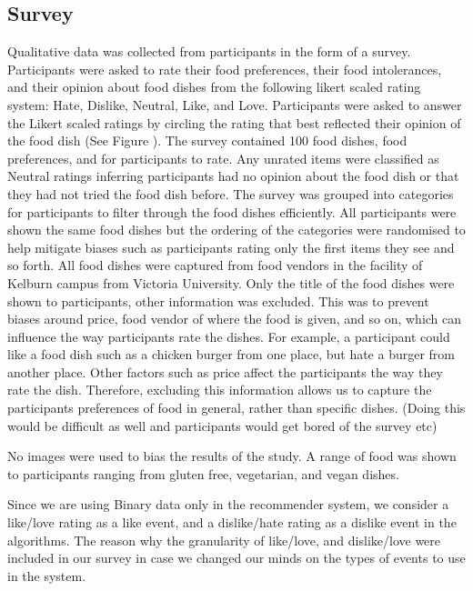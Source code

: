 
\subsection{Survey}

Qualitative data was collected from participants in the form of a survey. Participants were asked to rate their food preferences, their food intolerances, and their opinion about food dishes from the following likert scaled rating system: Hate, Dislike, Neutral, Like, and Love. Participants were asked to answer the Likert scaled ratings by circling the rating that best reflected their opinion of the food dish (See Figure ). The survey contained 100 food dishes,  food preferences, and  for participants to rate. Any unrated items were classified as Neutral ratings inferring participants had no opinion about the food dish or that they had not tried the food dish before. The survey was grouped into categories for participants to filter through the food dishes efficiently. All participants were shown the same food dishes but the ordering of the categories were randomised to help mitigate biases such as participants rating only the first items they see and so forth. All food dishes were captured from food vendors in the facility of Kelburn campus from Victoria University. Only the title of the food dishes were shown to participants, other information was excluded. This was to prevent biases around price, food vendor of where the food is given, and so on, which can influence the way participants rate the dishes. For example, a participant could like a food dish such as a chicken burger from one place, but hate a burger from another place. Other factors such as price affect the participants the way they rate the dish. Therefore, excluding this information allows us to capture the participants preferences of food in general, rather than specific dishes.  (Doing this would be difficult as well and participants would get bored of the survey etc)

No images were used to bias the results of the study. 
A range of food was shown to participants ranging from gluten free, vegetarian, and vegan dishes. 

Since we are using Binary data only in the recommender system, we consider a like/love rating as a like event, and a dislike/hate rating as a dislike event in the algorithms. The reason why the granularity of like/love, and dislike/love were included in our survey in case we changed our minds on the types of events to use in the system.

